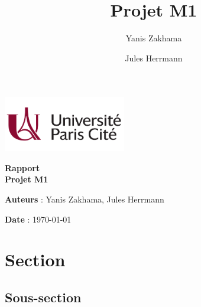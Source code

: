\documentclass{article}
\title{Projet M1}
\author{Yanis Zakhama}
\author{Jules Herrmann}
\begin{document}
\begin{titlepage}
\hspace{0pt}
    
\begin{center}
\includegraphics[width=0.4\textwidth]{fig/logo-UP.png}\\[0.1in]

\vspace{.2in}

\Large \textbf {Rapport}\\[0.7in]
\Large \textbf {Projet M1}\\[0.7in]
\end{center}

\vspace{.2in}
\textbf{Auteurs} : Yanis Zakhama, Jules Herrmann

\textbf{Date} : \today

\vspace{.3in}

\vfill
\hspace{0pt}
\end{titlepage}
\cleardoublepage

\tableofcontents

\section{Section}
\subsection{Sous-section}

\cite{dummy_article}

\cleardoublepage


\end{document}
